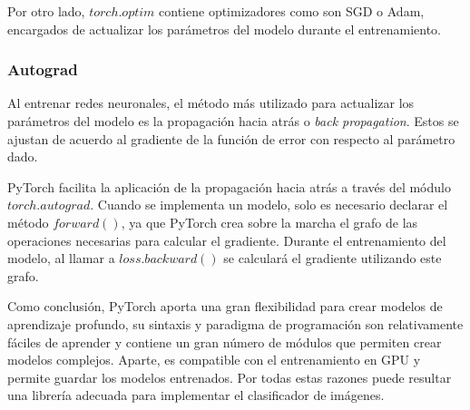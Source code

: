 Por otro lado, $torch.optim$ contiene optimizadores como son SGD o Adam, encargados de actualizar los parámetros del modelo durante el entrenamiento. \cite{pytorch-doc}

\subsubsection{Autograd}
Al entrenar redes neuronales, el método más utilizado para actualizar los parámetros del modelo es la propagación hacia atrás o \textit{back propagation}. Estos se ajustan de acuerdo al gradiente de la función de error con respecto al parámetro dado.

PyTorch facilita la aplicación de la propagación hacia atrás a través del módulo $torch.autograd$. Cuando se implementa un modelo, solo es necesario declarar el método $forward()$, ya que PyTorch crea sobre la marcha el grafo de las operaciones necesarias para calcular el gradiente. Durante el entrenamiento del modelo, al llamar a $loss.backward()$ se calculará el gradiente utilizando este grafo. \cite{pytorch-doc}

Como conclusión, PyTorch aporta una gran flexibilidad para crear modelos de aprendizaje profundo, su sintaxis y paradigma de programación son relativamente fáciles de aprender y contiene un gran número de módulos que permiten crear modelos complejos. Aparte, es compatible con el entrenamiento en GPU y permite guardar los modelos entrenados. Por todas estas razones puede resultar una librería adecuada para implementar el clasificador de imágenes.